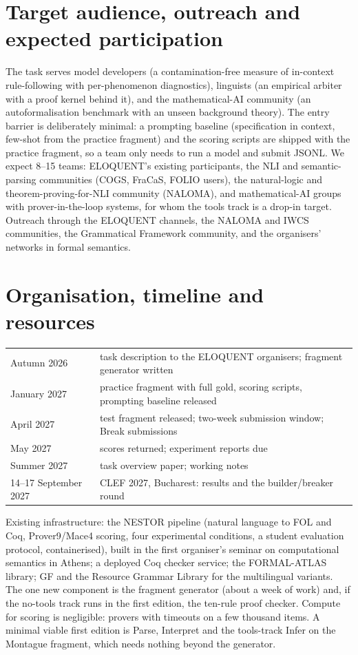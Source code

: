 \documentclass[10pt,a4paper]{article}
\begin{document}
\section{Target audience, outreach and expected participation}
The task serves model developers (a contamination-free measure of in-context rule-following with per-phenomenon diagnostics), linguists (an empirical arbiter with a proof kernel behind it), and the mathematical-AI community (an autoformalisation benchmark with an unseen background theory). The entry barrier is deliberately minimal: a prompting baseline (specification in context, few-shot from the practice fragment) and the scoring scripts are shipped with the practice fragment, so a team only needs to run a model and submit JSONL. We expect 8--15 teams: ELOQUENT's existing participants, the NLI and semantic-parsing communities (COGS, FraCaS, FOLIO users), the natural-logic and theorem-proving-for-NLI community (NALOMA), and mathematical-AI groups with prover-in-the-loop systems, for whom the tools track is a drop-in target. Outreach through the ELOQUENT channels, the NALOMA and IWCS communities, the Grammatical Framework community, and the organisers' networks in formal semantics.

\section{Organisation, timeline and resources}
\begin{center}\small
\begin{tabular}{@{}ll@{}}
\toprule
Autumn 2026 & task description to the ELOQUENT organisers; fragment generator written \\
January 2027 & practice fragment with full gold, scoring scripts, prompting baseline released \\
April 2027 & test fragment released; two-week submission window; Break submissions \\
May 2027 & scores returned; experiment reports due \\
Summer 2027 & task overview paper; working notes \\
14--17 September 2027 & CLEF 2027, Bucharest: results and the builder/breaker round \\
\bottomrule
\end{tabular}
\end{center}
Existing infrastructure: the NESTOR pipeline (natural language to FOL and Coq, Prover9/Mace4 scoring, four experimental conditions, a student evaluation protocol, containerised), built in the first organiser's seminar on computational semantics in Athens; a deployed Coq checker service; the FORMAL-ATLAS library; GF and the Resource Grammar Library for the multilingual variants. The one new component is the fragment generator (about a week of work) and, if the no-tools track runs in the first edition, the ten-rule proof checker. Compute for scoring is negligible: provers with timeouts on a few thousand items. A minimal viable first edition is Parse, Interpret and the tools-track Infer on the Montague fragment, which needs nothing beyond the generator.
\end{document}
